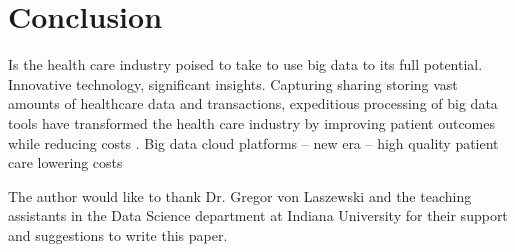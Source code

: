 \documentclass[sigconf]{acmart}
\begin{document}
\section{Conclusion}
Is the health care industry poised to take to use big data to its full potential. Innovative technology, significant insights.
Capturing sharing storing vast amounts of healthcare data and transactions, expeditious processing of big data tools have transformed the health care industry by improving patient outcomes while reducing costs \cite{www-google-christian}.
Big data cloud platforms – new era – high quality patient care lowering costs







\begin{acks}

  The author would like to thank Dr. Gregor von Laszewski and the teaching assistants in the Data Science department at Indiana University for their support and suggestions to write this paper.

\end{acks}




 
\end{document}
